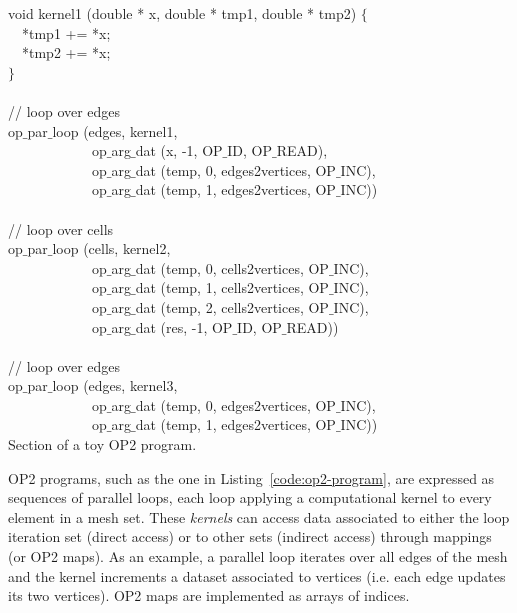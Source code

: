 \begin{algorithm}[t]
\scriptsize\ttfamily
{}

void kernel1 (double * x, double * tmp1, double * tmp2) $\lbrace$\\
~~*tmp1 += *x;\\
~~*tmp2 += *x;\\
$\rbrace$~\\
~\\
// loop over edges\\
op$\_$par$\_$loop (edges, kernel1,\\
~~~~~~~~~~~~op$\_$arg$\_$dat (x, -1, OP$\_$ID, OP$\_$READ),\\
~~~~~~~~~~~~op$\_$arg$\_$dat (temp, 0, edges2vertices, OP$\_$INC),\\
~~~~~~~~~~~~op$\_$arg$\_$dat (temp, 1, edges2vertices, OP$\_$INC))\\
~\\
// loop over cells\\
op$\_$par$\_$loop (cells, kernel2,\\
~~~~~~~~~~~~op$\_$arg$\_$dat (temp, 0, cells2vertices, OP$\_$INC),\\
~~~~~~~~~~~~op$\_$arg$\_$dat (temp, 1, cells2vertices, OP$\_$INC),\\
~~~~~~~~~~~~op$\_$arg$\_$dat (temp, 2, cells2vertices, OP$\_$INC),\\
~~~~~~~~~~~~op$\_$arg$\_$dat (res, -1, OP$\_$ID, OP$\_$READ))\\
~\\
// loop over edges\\
op$\_$par$\_$loop (edges, kernel3,\\
~~~~~~~~~~~~op$\_$arg$\_$dat (temp, 0, edges2vertices, OP$\_$INC),\\
~~~~~~~~~~~~op$\_$arg$\_$dat (temp, 1, edges2vertices, OP$\_$INC))\\

\caption{Section of a toy OP2 program.}
\label{code:op2program}
\end{algorithm}

OP2 programs, such as the one in Listing~\ref{code:op2-program}, are expressed as sequences of parallel loops, each loop applying a computational kernel to every element in a mesh set. These {\it kernels} can access data associated to either the loop iteration set (direct access) or to other sets (indirect access) through mappings (or OP2 maps). As an example, a parallel loop iterates over all edges of the mesh and the kernel increments a dataset associated to vertices (i.e. each edge updates its two vertices). OP2 maps are implemented as arrays of indices.

